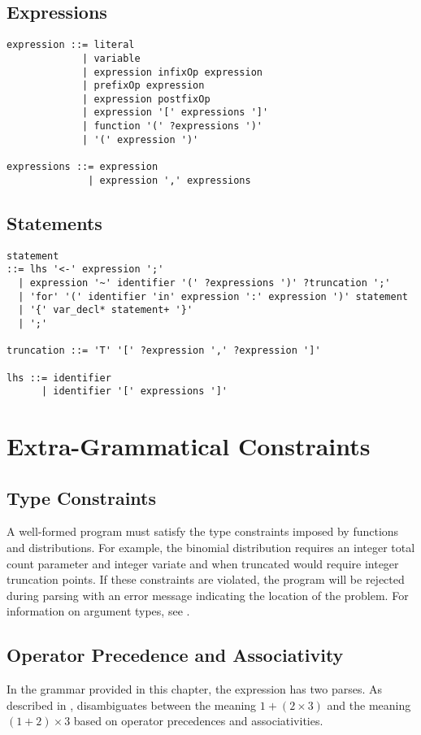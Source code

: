 \subsection{Expressions}

{
\small
\begin{Verbatim}
expression ::= literal
             | variable
             | expression infixOp expression
             | prefixOp expression
             | expression postfixOp
             | expression '[' expressions ']'
             | function '(' ?expressions ')'
             | '(' expression ')'

expressions ::= expression
              | expression ',' expressions
\end{Verbatim}
}

\subsection{Statements}

{
\small
\begin{Verbatim}
statement 
::= lhs '<-' expression ';'
  | expression '~' identifier '(' ?expressions ')' ?truncation ';'
  | 'for' '(' identifier 'in' expression ':' expression ')' statement
  | '{' var_decl* statement+ '}'
  | ';'

truncation ::= 'T' '[' ?expression ',' ?expression ']'

lhs ::= identifier
      | identifier '[' expressions ']'

\end{Verbatim}
%
}

\section{Extra-Grammatical Constraints}

\subsection{Type Constraints}

A well-formed \Stan program
must satisfy the type constraints imposed by functions and
distributions.  For example, the binomial distribution requires an
integer total count parameter and integer variate and when truncated
would require integer truncation points.  If these constraints are
violated, the program will be rejected during parsing with an error
message indicating the location of the problem.  For information on
argument types, see .

\subsection{Operator Precedence and Associativity}

In the \Stan grammar provided in this chapter, the expression  has two parses.  As described in
, \Stan disambiguates between the
meaning $1 + (2 \times 3)$ and the meaning $(1 + 2) \times 3$ based on
operator precedences and associativities.

